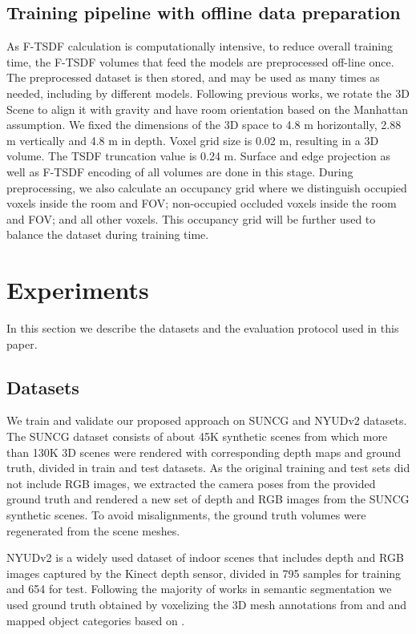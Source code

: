 \subsection{Training pipeline with offline data preparation}

 As F-TSDF calculation is computationally intensive, to reduce overall training time, the F-TSDF volumes that feed the models are preprocessed off-line once. The preprocessed dataset is then stored, and may be used as many times as needed, including by different models. Following previous works, we rotate the 3D Scene to align it with gravity and have room orientation based on the Manhattan assumption. We fixed the dimensions of the 3D space to 4.8 m horizontally, 2.88 m vertically and 4.8 m in depth. Voxel grid size is 0.02 m, resulting in a  3D volume.  The TSDF truncation value is 0.24 m. Surface and edge projection as well as F-TSDF encoding of all volumes are done in this stage.
During preprocessing, we also calculate an occupancy grid where we distinguish occupied voxels inside the room and FOV; non-occupied occluded voxels inside the room and FOV; and all other voxels. This occupancy grid will be further used to balance the dataset during training time. 




\section{Experiments}
In this section we describe the datasets and the evaluation protocol used in this paper. 

\subsection{Datasets}
\label{sec:datasets}

We train and validate our proposed approach on SUNCG \cite{song_semantic_2017} and NYUDv2 \cite{silberman_2012} datasets. 
The SUNCG dataset consists of about 45K synthetic scenes from which more than 130K 3D scenes were rendered with corresponding depth maps and ground truth, divided in train and test datasets. As the original training and test sets did not include RGB images, we extracted the camera poses from the provided ground truth and rendered a new set of depth and RGB images from the SUNCG synthetic scenes. To avoid misalignments, the ground truth volumes were regenerated from the scene meshes.  

NYUDv2 is a widely used dataset of indoor scenes that includes depth and RGB images captured by the Kinect depth sensor, divided in 795 samples for training and 654 for test. Following the majority of works in semantic segmentation we used ground truth obtained by voxelizing the 3D mesh annotations from \cite{Guo2015} and and mapped object categories based on \cite{Handa2015}.


